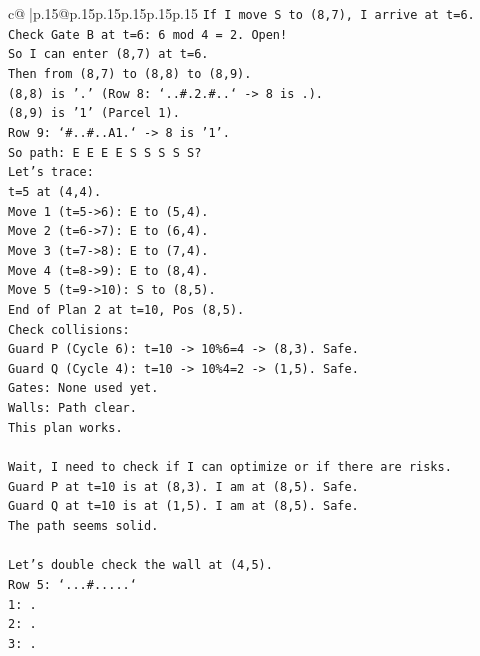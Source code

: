 \documentclass{article}
\begin{document}
{\begin{supertabular}{c@{$\;$}|p{.15\linewidth}@{}p{.15\linewidth}p{.15\linewidth}p{.15\linewidth}p{.15\linewidth}p{.15\linewidth}}
{{{\texttt{If I move S to (8,7), I arrive at t=6.} \\
\texttt{Check Gate B at t=6: 6 mod 4 = 2. Open!} \\
\texttt{So I can enter (8,7) at t=6.} \\
\texttt{Then from (8,7) to (8,8) to (8,9).} \\
\texttt{(8,8) is '.' (Row 8: `..\#.2.\#..` {-}> 8 is .).} \\
\texttt{(8,9) is '1' (Parcel 1).} \\
\texttt{Row 9: `\#..\#..A1.` {-}> 8 is '1'.} \\
\texttt{So path: E E E E S S S S S?} \\
\texttt{Let's trace:} \\
\texttt{t=5 at (4,4).} \\
\texttt{Move 1 (t=5{-}>6): E to (5,4).} \\
\texttt{Move 2 (t=6{-}>7): E to (6,4).} \\
\texttt{Move 3 (t=7{-}>8): E to (7,4).} \\
\texttt{Move 4 (t=8{-}>9): E to (8,4).} \\
\texttt{Move 5 (t=9{-}>10): S to (8,5).} \\
\texttt{End of Plan 2 at t=10, Pos (8,5).} \\
\texttt{Check collisions:} \\
\texttt{Guard P (Cycle 6): t=10 {-}> 10\%6=4 {-}> (8,3). Safe.} \\
\texttt{Guard Q (Cycle 4): t=10 {-}> 10\%4=2 {-}> (1,5). Safe.} \\
\texttt{Gates: None used yet.} \\
\texttt{Walls: Path clear.} \\
\texttt{This plan works.} \\
\\ 
\texttt{Wait, I need to check if I can optimize or if there are risks.} \\
\texttt{Guard P at t=10 is at (8,3). I am at (8,5). Safe.} \\
\texttt{Guard Q at t=10 is at (1,5). I am at (8,5). Safe.} \\
\texttt{The path seems solid.} \\
\\ 
\texttt{Let's double check the wall at (4,5).} \\
\texttt{Row 5: `...\#.....`} \\
\texttt{1: .} \\
\texttt{2: .} \\
\texttt{3: .} \\
}}}
\end{supertabular}}
\end{document}
